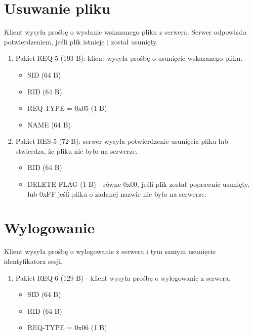 \documentclass{article}
\begin{document}
	\section{Usuwanie pliku}
	Klient wysyła prośbę o wysłanie wskazanego pliku z serwera. Serwer odpowiada potwierdzeniem, jeśli plik istnieje i został usunięty. 
	\begin{enumerate}
		\item Pakiet REQ-5 (193 B): klient wysyła prośbę o usunięcie wskazanego pliku. 
		\begin{itemize}
			\item SID (64 B)
			\item RID (64 B)
			\item REQ-TYPE = 0x05 (1 B)
			\item NAME (64 B)
		\end{itemize}
	
		\item Pakiet RES-5 (72 B): serwer wysyła potwierdzenie usunięcia pliku lub stwierdza, że pliku nie było na serwerze. 
		\begin{itemize}
			\item RID (64 B)
			\item DELETE-FLAG (1 B) - równe 0x00, jeśli plik został poprawnie usunięty, lub 0xFF jeśĺi pliku o zadanej nazwie nie było na serwerze. 
		\end{itemize}
		
	\end{enumerate}

	\section{Wylogowanie}
	Klient wysyła prośbę o wylogowanie z serwera i tym samym usunięcie identyfikatora sesji. 
	\begin{enumerate}
		\item Pakiet REQ-6 (129 B) - klient wysyła prośbę o wylogowanie z serwera. 
		\begin{itemize}
			\item SID (64 B)
			\item RID (64 B)
			\item REQ-TYPE = 0x06 (1 B)
		\end{itemize}
		
		
	\end{enumerate}



	
\end{document}
